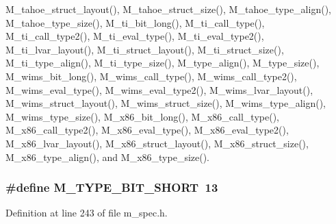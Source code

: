 M\_\-tahoe\_\-struct\_\-layout(), M\_\-tahoe\_\-struct\_\-size(), M\_\-tahoe\_\-type\_\-align(), M\_\-tahoe\_\-type\_\-size(), M\_\-ti\_\-bit\_\-long(), M\_\-ti\_\-call\_\-type(), M\_\-ti\_\-call\_\-type2(), M\_\-ti\_\-eval\_\-type(), M\_\-ti\_\-eval\_\-type2(), M\_\-ti\_\-lvar\_\-layout(), M\_\-ti\_\-struct\_\-layout(), M\_\-ti\_\-struct\_\-size(), M\_\-ti\_\-type\_\-align(), M\_\-ti\_\-type\_\-size(), M\_\-type\_\-align(), M\_\-type\_\-size(), M\_\-wims\_\-bit\_\-long(), M\_\-wims\_\-call\_\-type(), M\_\-wims\_\-call\_\-type2(), M\_\-wims\_\-eval\_\-type(), M\_\-wims\_\-eval\_\-type2(), M\_\-wims\_\-lvar\_\-layout(), M\_\-wims\_\-struct\_\-layout(), M\_\-wims\_\-struct\_\-size(), M\_\-wims\_\-type\_\-align(), M\_\-wims\_\-type\_\-size(), M\_\-x86\_\-bit\_\-long(), M\_\-x86\_\-call\_\-type(), M\_\-x86\_\-call\_\-type2(), M\_\-x86\_\-eval\_\-type(), M\_\-x86\_\-eval\_\-type2(), M\_\-x86\_\-lvar\_\-layout(), M\_\-x86\_\-struct\_\-layout(), M\_\-x86\_\-struct\_\-size(), M\_\-x86\_\-type\_\-align(), and M\_\-x86\_\-type\_\-size().
\subsubsection{\setlength{\rightskip}{0pt plus 5cm}\#define M\_\-TYPE\_\-BIT\_\-SHORT~13}\label{m__spec_8h_85537d044c355bbcf1573742d04e0339}




Definition at line 243 of file m\_\-spec.h.

